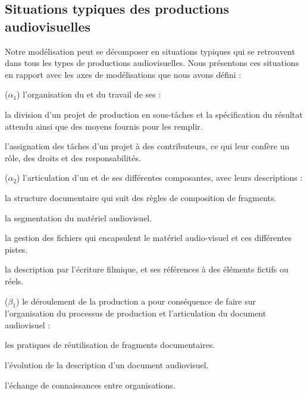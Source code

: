 \subsection{Situations typiques des productions audiovisuelles}
Notre modélisation peut se décomposer en situations typiques qui se retrouvent dans tous les types de productions audiovisuelles.
Nous présentons ces situations en rapport avec les axes de modélisations que nous avons défini :
\begin{listeni}
	\item[($\alpha_1$)] l'organisation du  et du travail de ses  : 
	\begin{liste}
		\item la division d'un projet de production en sous-tâches et la spécification du résultat attendu ainsi que des moyens fournis pour les remplir.

		\item l'assignation des tâches d'un projet à des contributeurs, ce qui leur confère un rôle, des droits et des responsabilités.
	\end{liste}

	\item[($\alpha_2$)] l'articulation d'un  et de ses différentes composantes, avec leurs descriptions : 
	\begin{liste}
		\item la structure documentaire qui suit des règles de composition de fragments.
		\item la segmentation du matériel audiovisuel.
		\item la gestion des fichiers qui encapsulent le matériel audio-visuel et ces différentes pistes.
		\item la description par l'écriture filmique, et ses références à des éléments fictifs ou réels.
	\end{liste}


	\item[($\beta_1$)] le déroulement de la production a pour conséquence de faire  sur l'organisation du processus de production et l'articulation du document audiovisuel : 
	\begin{liste}
		\item les pratiques de réutilisation de fragments documentaires.
		\item l'évolution de la description d'un document audiovisuel.
		\item l'échange de connaissances entre organisations.
	\end{liste}


\end{listeni}
